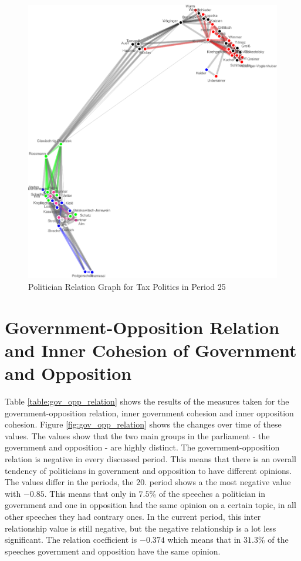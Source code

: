 \begin{figure}
\center
	\includegraphics[width=\textwidth]{imgs/graphs/graph_25_tax.eps}
	
	\caption{Politician Relation Graph for Tax Politics in Period 25}
	\label{fig:pol_graph_tax}
\end{figure}

\section{Government-Opposition Relation and Inner Cohesion of Government and Opposition}
\label{sec:gov_opp_relation}
Table \ref{table:gov_opp_relation} shows the results of the measures taken for the government-opposition relation, inner government cohesion and inner opposition cohesion. Figure \ref{fig:gov_opp_relation} shows the changes over time of these values. The values show that the two main groups in the parliament - the government and opposition - are highly distinct. The government-opposition relation is negative in every discussed period. This means that there is an overall tendency of politicians in government and opposition to have different opinions. The values differ in the periods, the 20. period shows a the most negative value with $-0.85$. This means that only in $7.5$\% of the speeches a politician in government and one in opposition had the same opinion on a certain topic, in all other speeches they had contrary ones. In the current period, this inter relationship value is still negative, but the negative relationship is a lot less significant. The relation coefficient is $-0.374$ which means that in $31.3$\% of the speeches government and opposition have the same opinion.

